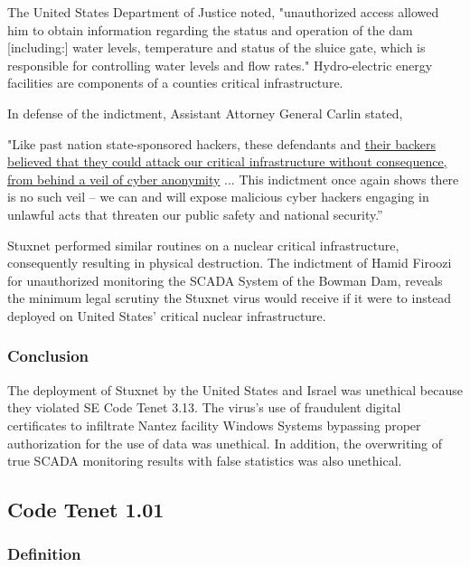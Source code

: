 \documentclass[12pt]{article}
\begin{document}
\begin{multicols}{2}
The United States Department of Justice noted, "unauthorized access allowed him to obtain information regarding the status and operation of the dam [including:] water levels, temperature and status of the sluice gate, which is responsible for controlling water levels and flow rates."\cite{sevenIraniansIndicted} Hydro-electric energy facilities are components of a counties critical infrastructure.

In defense of the indictment, Assistant Attorney General Carlin stated,

\begin{displayquote}
"Like past nation state-sponsored hackers, these defendants and \ul{their backers believed that they could attack our critical infrastructure without consequence, from behind a veil of cyber anonymity} ... This indictment once again shows there is no such veil – we can and will expose malicious cyber hackers engaging in unlawful acts that threaten our public safety and national security.”\cite{sevenIraniansIndicted}
\end{displayquote}

Stuxnet performed similar routines on a nuclear critical infrastructure, consequently resulting in physical destruction. The indictment of Hamid Firoozi for unauthorized monitoring the SCADA System of the Bowman Dam, reveals the minimum legal scrutiny the Stuxnet virus would receive if it were to instead deployed on United States' critical nuclear infrastructure.

\subsubsection{Conclusion}

The deployment of Stuxnet by the United States and Israel was unethical because they violated SE Code Tenet 3.13. The virus's use of fraudulent digital certificates to infiltrate Nantez facility Windows Systems bypassing proper authorization for the use of data was unethical. In addition, the overwriting of true SCADA monitoring results with false statistics was also unethical.

\subsection{Code Tenet 1.01}

\subsubsection{Definition}


\end{multicols}
\end{document}

